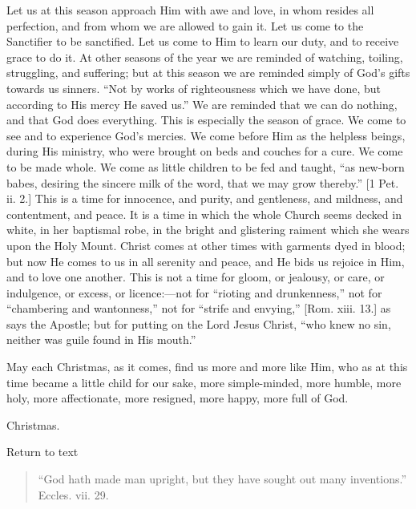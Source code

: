 Let us at this season approach Him with awe and love, in whom
resides all perfection, and from whom we are allowed to gain it. Let
us come to the Sanctifier to be sanctified. Let us come to Him to
learn our duty, and to receive grace to do it. At other seasons of the
year we are reminded of watching, toiling, struggling, and suffering;
but at this season we are reminded simply of God's gifts towards us
sinners. ``Not by works of righteousness which we have done, but
according to His mercy He saved us.'' We are reminded that we can
do nothing, and that God does everything. This is especially the
season of grace. We come to see and to experience God's mercies. We
come before Him as the helpless beings, during His ministry, who were
brought on beds and couches for a cure. We come to be made whole. We
come as little children to be fed and taught, ``as new-born babes,
desiring the sincere milk of the word, that we may grow thereby.''
[1 Pet. ii. 2.] This is a time for innocence, and purity, and
gentleness, and mildness, and contentment, and peace. It is a time in
which the whole Church seems decked in white, in her baptismal robe,
in the bright and glistering raiment which she wears upon the Holy
Mount. Christ comes at other times with garments dyed in blood; but
now He comes to us in all serenity and peace, and He bids us rejoice
in Him, and to love one another. This is not a time for gloom, or
jealousy, or care, or indulgence, or excess, or licence:—not for
``rioting and drunkenness,'' not for ``chambering and
wantonness,'' not for ``strife and envying,'' [Rom. xiii.
13.] as says the Apostle; but for putting on the Lord Jesus Christ,
``who knew no sin, neither was guile found in His mouth.''

May each Christmas, as it comes, find us more and more like Him,
who as at this time became a little child for our sake, more
simple-minded, more humble, more holy, more affectionate, more
resigned, more happy, more full of God.


Christmas.

Return to text


\begin{quote}

``God hath made man upright, but they have sought out many
inventions.'' Eccles. vii. 29.

\end{quote}

